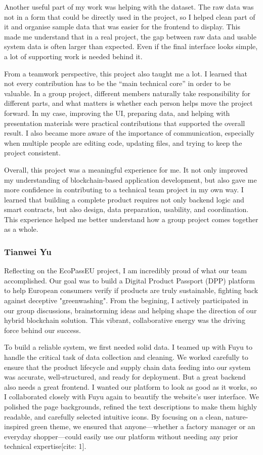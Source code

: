 \documentclass[runningheads]{llncs}
\begin{document}
	Another useful part of my work was helping with the dataset. The raw data was not in a form that could be directly used in the project, so I helped clean part of it and organise sample data that was easier for the frontend to display. This made me understand that in a real project, the gap between raw data and usable system data is often larger than expected. Even if the final interface looks simple, a lot of supporting work is needed behind it.
	
	From a teamwork perspective, this project also taught me a lot. I learned that not every contribution has to be the “main technical core” in order to be valuable. In a group project, different members naturally take responsibility for different parts, and what matters is whether each person helps move the project forward. In my case, improving the UI, preparing data, and helping with presentation materials were practical contributions that supported the overall result. I also became more aware of the importance of communication, especially when multiple people are editing code, updating files, and trying to keep the project consistent.
	
	Overall, this project was a meaningful experience for me. It not only improved my understanding of blockchain-based application development, but also gave me more confidence in contributing to a technical team project in my own way. I learned that building a complete product requires not only backend logic and smart contracts, but also design, data preparation, usability, and coordination. This experience helped me better understand how a group project comes together as a whole.
	
	\subsubsection{Tianwei Yu}
	
	Reflecting on the EcoPassEU project, I am incredibly proud of what our team accomplished. Our goal was to build a Digital Product Passport (DPP) platform to help European consumers verify if products are truly sustainable, fighting back against deceptive "greenwashing". From the begining, I actively participated in our group discussions, brainstorming ideas and helping shape the direction of our hybrid blockchain solution. This vibrant, collaborative energy was the driving force behind our success.
	
	To build a reliable system, we first needed solid data. I teamed up with Fuyu to handle the critical task of data collection and cleaning. We worked carefully to ensure that the product lifecycle and supply chain data feeding into our system was accurate, well-structured, and ready for deployment. But a great backend also needs a great frontend. I wanted our platform to look as good as it works, so I collaborated closely with Fuyu again to beautify the website's user interface. We polished the page backgrounds, refined the text descriptions to make them highly readable, and carefully selected intuitive icons. By focusing on a clean, nature-inspired green theme, we ensured that anyone—whether a factory manager or an everyday shopper—could easily use our platform without needing any prior technical expertise[cite: 1].
	
\end{document}
